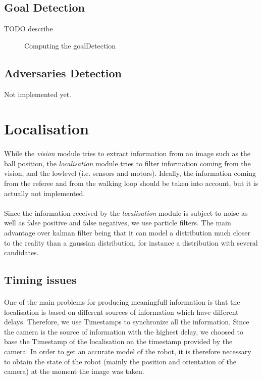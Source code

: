 \documentclass[a4paper,12pt]{article}
\begin{document}
\subsection{Goal Detection}
TODO describe

\begin{figure}
  \centering
  \caption{\label{fig:goalDetection}Computing the goalDetection}
  
\end{figure}

\subsection{Adversaries Detection}
Not implemented yet.

\section{Localisation}
\paragraph{}
While the \emph{vision} module tries to extract information from an image such
as the ball position, the \emph{localisation} module tries to filter information
coming from the vision, and the lowlevel (i.e. sensors and motors). Ideally, the
information coming from the referee and from the walking loop should be taken
into account, but it is actually not implemented.
\paragraph{}
Since the information received by the \emph{localisation} module is subject to
noise as well as false positive and false negatives, we use particle filters.
The main advantage over kalman filter being that it can model a distribution
much closer to the reality than a gaussian distribution, for instance a
distribution with several candidates.

\subsection{Timing issues}
\paragraph{}
One of the main problems for producing meaningfull information is that the
localisation is based on different sources of information which have
different delays. Therefore, we use Timestamps to synchronize all the
information. Since the camera is the source of information with the highest
delay, we choosed to base the Timestamp of the localisation on the timestamp
provided by the camera. In order to get an accurate model of the robot, it is
therefore necessary to obtain the state of the robot (mainly the position and
orientation of the camera) at the moment the image was taken.
\end{document}
